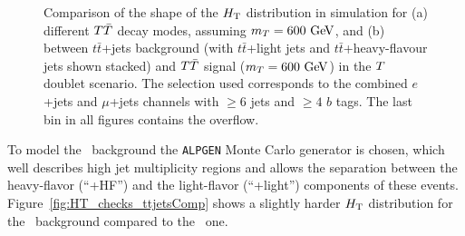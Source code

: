 \begin{figure}[h!tb]\begin{center}
	\caption{Comparison of the shape of the $\HT$ distribution in simulation for (a) different $\TT$ decay modes, assuming $m_{\T}=600\gev$,
and (b) between $t\bar{t}$+jets background (with $t\bar{t}$+light jets and $t\bar{t}$+heavy-flavour jets shown stacked) 
and $\TT$ signal ($m_{\T}=600\gev$) in the $\T$ doublet scenario.
The selection used corresponds to the combined $e$+jets and $\mu$+jets channels with $\geq 6$ jets and $\geq 4$ $b$ tags. 
The last bin in all figures contains the overflow.}
\end{center}\end{figure}

To model the \ttbar\ background
the \texttt{ALPGEN} Monte Carlo generator is chosen, which well
describes high jet multiplicity regions and allows the separation
between the heavy-flavor (``\ttbar+HF'') and the light-flavor
(``\ttbar+light'') components of these events.
Figure~\ref{fig:HT_checks_ttjetsComp} shows a slightly harder
$\HT$ distribution for the \tthf\ background compared to the
\ttlf\ one.


